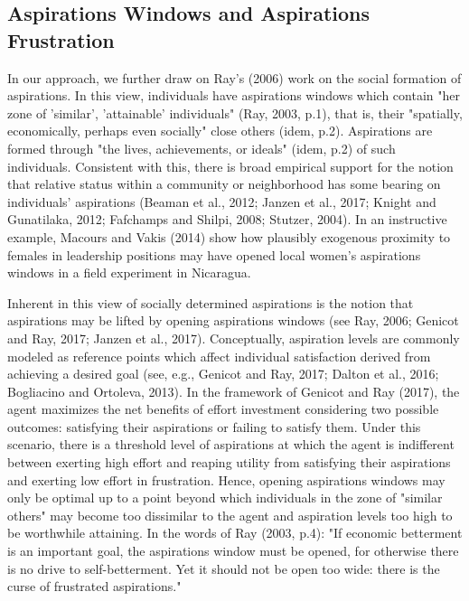 \documentclass[11.5pt]{article}
\begin{document}
\subsection{Aspirations Windows and Aspirations Frustration}

In our approach, we further draw on Ray's (2006) work on the social formation of aspirations. In this view, individuals have aspirations windows which contain "her zone of 'similar', 'attainable' individuals" (Ray, 2003, p.1), that is, their "spatially, economically, perhaps even socially" close others (idem, p.2). Aspirations are formed through "the lives, achievements, or ideals" (idem, p.2) of such individuals. Consistent with this, there is broad empirical support for the notion that relative status within a community or neighborhood has some bearing on individuals' aspirations (Beaman et al., 2012; Janzen et al., 2017; Knight and Gunatilaka, 2012; Fafchamps and Shilpi, 2008; Stutzer, 2004). In an instructive example, Macours and Vakis (2014) show how plausibly exogenous proximity to females in leadership positions may have opened local women's aspirations windows in a field experiment in Nicaragua. 

Inherent in this view of socially determined aspirations is the notion that aspirations may be lifted by opening aspirations windows (see Ray, 2006; Genicot and Ray, 2017; Janzen et al., 2017). Conceptually, aspiration levels are commonly modeled as reference points which affect individual satisfaction derived from achieving a desired goal (see, e.g., Genicot and Ray, 2017; Dalton et al., 2016; Bogliacino and Ortoleva, 2013). In the framework of Genicot and Ray (2017), the agent maximizes the net benefits of effort investment considering two possible outcomes: satisfying their aspirations or failing to satisfy them. Under this scenario, there is a threshold level of aspirations at which the agent is indifferent between exerting high effort and reaping utility from satisfying their aspirations and exerting low effort in frustration. Hence, opening aspirations windows may only be optimal up to a point beyond which individuals in the zone of "similar others" may become too dissimilar to the agent and aspiration levels too high to be worthwhile attaining. In the words of Ray (2003, p.4): "If economic betterment is an important goal, the aspirations window must be opened, for otherwise there is no drive to self-betterment. Yet it should not be open too wide: there is the curse of frustrated aspirations."
\end{document}
